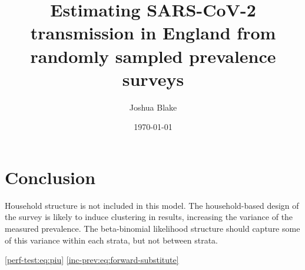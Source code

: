 \documentclass{cam-thesis}
\title{Estimating SARS-CoV-2 transmission in England from randomly sampled prevalence surveys}
\author{Joshua Blake}
\date{\today}
\begin{document}
\frontmatter{}

\listoffigures









\chapter{Conclusion}
Household structure is not included in this model.
The household-based design of the survey is likely to induce clustering in results, increasing the variance of the measured prevalence.
The beta-binomial likelihood structure should capture some of this variance within each strata, but not between strata.

\newrefcontext[sorting=nyt]
\printbibliography[heading=bibintoc]

\appendix






\cref{perf-test:eq:piu}
\cref{inc-prev:eq:forward-substitute}
\listoftodos
\end{document}
